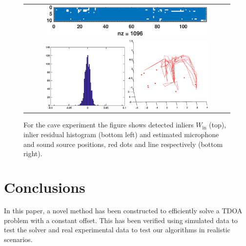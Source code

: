 \documentclass[
]{book}
\def\Win{W_{\text{in}}}
\begin{document}
\begin{figure}
\begin{tabular}{c}
\includegraphics[width=0.8\textwidth]{original_papers/icassp_2018/figs/bat_20180710_inl.eps} \\
\includegraphics[width=0.4\textwidth]{original_papers/icassp_2018/figs/bat_20180710_res.eps} 
\includegraphics[width=0.4\textwidth]{original_papers/icassp_2018/figs/bat_20180710_fig.eps} \\
\end{tabular}
\caption{For the cave experiment the figure shows detected inliers $\Win$ (top), inlier residual histogram (bottom left) and  estimated microphone and sound source positions, red dots and line respectively (bottom right).}
\label{f_bat}
\end{figure}

\vspace{-5pt}
\section{Conclusions}
\label{sec:exp}
\vspace{-5pt}

In this paper, a novel method has been constructed to efficiently solve a TDOA problem with a constant offset. This has been verified using simulated data to test the solver and real experimental data to test our algorithms in realistic scenarios.
\end{document}
